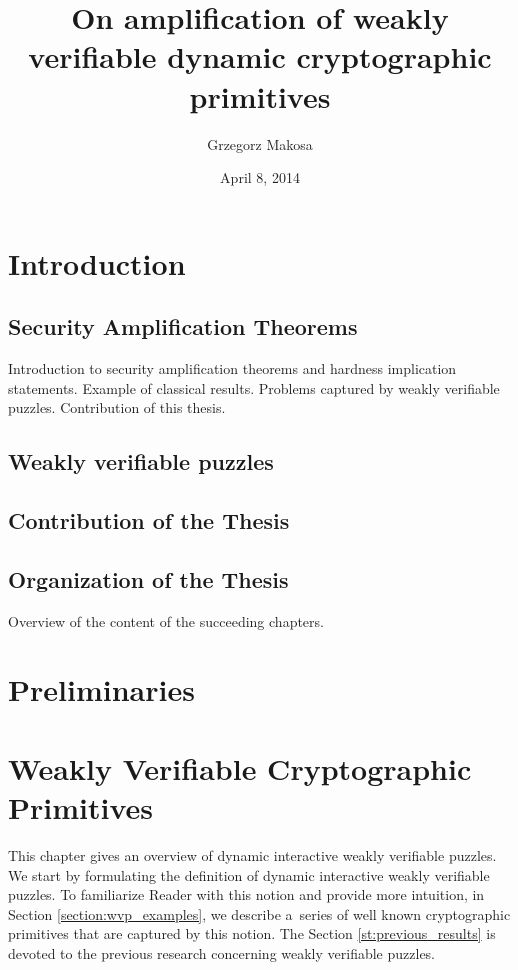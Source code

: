 \documentclass[11pt,a4paper,titlepage]{memoir}
\title{On amplification of weakly verifiable dynamic cryptographic primitives}
\author{Grzegorz Makosa}
\date{April 8, 2014}
\begin{document}
\frontmatter

%

\cleartorecto
\tableofcontents
\mainmatter

\chapter{Introduction}
\section{Security Amplification Theorems}
Introduction to security amplification theorems and hardness implication statements.
Example of classical results. Problems captured by weakly verifiable puzzles.
Contribution of this thesis.
\section{Weakly verifiable puzzles}
\section{Contribution of the Thesis}
\section{Organization of the Thesis}
Overview of the content of the succeeding chapters.

\chapter{Preliminaries}


\chapter{Weakly Verifiable Cryptographic Primitives}
This chapter gives an overview of dynamic interactive weakly verifiable puzzles.
We start by formulating the definition of dynamic interactive weakly verifiable puzzles.
To familiarize Reader with this notion and provide more intuition, in Section \ref{section:wvp_examples}, we describe
a~series of well known cryptographic primitives that are captured by this notion.
The Section \ref{st:previous_results} is devoted to the previous research concerning weakly verifiable puzzles.
\end{document}
